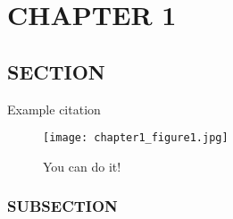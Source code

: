 \documentclass[../main/main]{subfiles}
\begin{document}
\chapter{CHAPTER 1}

\section{SECTION}
Example citation~\cite{dworkin2011justice}

\begin{figure}[H]
\centering
	\texttt{[image: chapter1\_figure1.jpg]}
	\caption{You can do it!}
\end{figure}

\subsection{SUBSECTION}

\printbibliography
\end{document}
